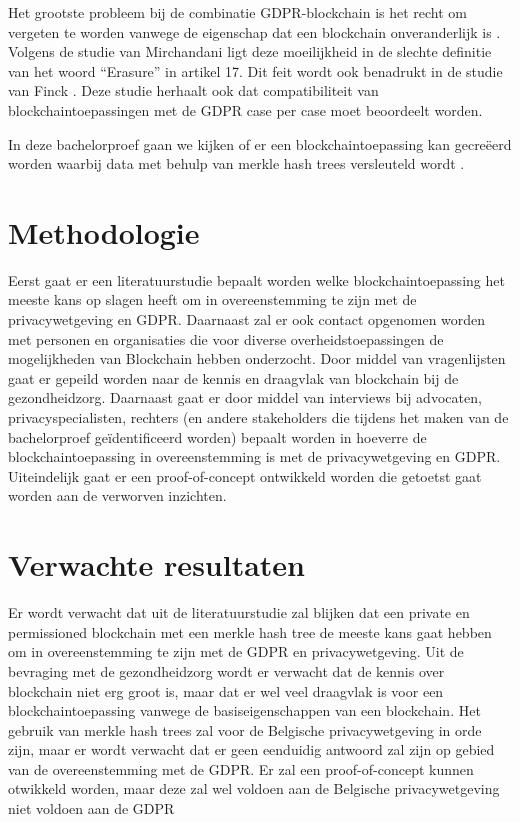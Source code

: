 Het grootste probleem bij de combinatie GDPR-blockchain is het recht om vergeten te worden vanwege de eigenschap dat een blockchain onveranderlijk is \autocite{Pilkington2016}. Volgens de studie van Mirchandani \autocite{Mirchandani2019} ligt deze moeilijkheid in de slechte definitie van het woord ``Erasure'' in artikel 17. Dit feit wordt ook benadrukt in de studie van Finck \autocite{Finck2019}. Deze studie herhaalt ook dat compatibiliteit van blockchaintoepassingen met de GDPR case per case moet beoordeelt worden.

In deze bachelorproef gaan we kijken of er een blockchaintoepassing kan gecreëerd worden waarbij data met behulp van merkle hash trees versleuteld wordt \autocite{Niaz2015}. 

\section{Methodologie}
\label{sec:methodologie}

Eerst gaat er een literatuurstudie bepaalt worden welke blockchaintoepassing het meeste kans op slagen heeft om in overeenstemming te zijn met de privacywetgeving en GDPR. Daarnaast zal er ook contact opgenomen worden met personen en organisaties die voor diverse overheidstoepassingen de mogelijkheden van Blockchain hebben onderzocht. Door middel van vragenlijsten gaat er gepeild worden naar de kennis en draagvlak van blockchain bij de gezondheidzorg. Daarnaast gaat er door middel van interviews bij advocaten, privacyspecialisten, rechters (en andere stakeholders die tijdens het maken van de bachelorproef geïdentificeerd worden) bepaalt worden in hoeverre de blockchaintoepassing in overeenstemming is met de privacywetgeving en GDPR. Uiteindelijk gaat er een proof-of-concept ontwikkeld worden die getoetst gaat worden aan de verworven inzichten.

\section{Verwachte resultaten}
\label{sec:verwachte_resultaten}

Er wordt verwacht dat uit de literatuurstudie zal blijken dat een private en permissioned blockchain met een merkle hash tree de meeste kans gaat hebben om in overeenstemming te zijn met de GDPR en privacywetgeving. Uit de bevraging met de gezondheidzorg wordt er verwacht dat de kennis over blockchain niet erg groot is, maar dat er wel veel draagvlak is voor een blockchaintoepassing vanwege de basiseigenschappen van een blockchain. Het gebruik van merkle hash trees zal voor de Belgische privacywetgeving in orde zijn, maar er wordt verwacht dat er geen eenduidig antwoord zal zijn op gebied van de overeenstemming met de GDPR. Er zal een proof-of-concept kunnen otwikkeld worden, maar deze zal wel voldoen aan de Belgische privacywetgeving niet voldoen aan de GDPR

